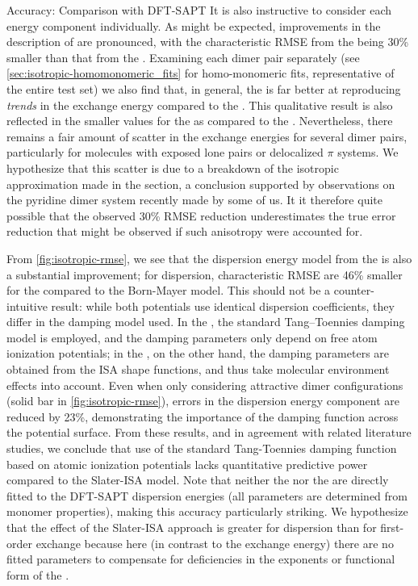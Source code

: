 \begin{subsection}{Accuracy: Comparison with DFT-SAPT}
It is also instructive to consider each energy component individually.  As
might be expected, improvements in the description of \erep are pronounced,
with the characteristic RMSE from the \isaffold being 30\% smaller than that from the \saptff.
Examining each dimer pair separately (see
\cref{sec:isotropic-homomonomeric_fits} for homo-monomeric
fits, representative of the entire test set) we also find that, in general, the \isaffold
is far better at reproducing \emph{trends} in the exchange energy compared to
the \saptff. This qualitative result is also reflected in the smaller \mse
values for the \isaffold as compared to the \saptff.
Nevertheless, there remains a fair amount of scatter in the exchange
energies for several dimer pairs, particularly for molecules with exposed lone
pairs or delocalized $\pi$ systems. We hypothesize that this scatter is due to
a breakdown of the isotropic approximation made in the 
section, a conclusion supported by observations on the pyridine dimer system
recently made by some of us.\cite{Misquitta2015b}
It it therefore quite possible that the observed 30\% RMSE reduction 
underestimates the true error reduction that might be observed
if such anisotropy were accounted for.

From  \cref{fig:isotropic-rmse}, we see that the dispersion energy model from the 
\isaffold is also a substantial improvement; for dispersion, characteristic RMSE
are 46\% smaller for the \isaffold compared to the Born-Mayer model.
This should not be a counter-intuitive result: while both potentials use identical
dispersion coefficients, they differ in the damping model used.
In the \saptff, the standard Tang--Toennies damping model is employed, and 
the damping parameters only depend on free atom ionization potentials; 
in the \isaffold, on the other hand, the damping parameters are obtained from the
ISA shape functions, and thus take 
molecular environment effects into account.
Even when only considering attractive dimer configurations (solid bar in
\cref{fig:isotropic-rmse}), errors in the dispersion energy component are reduced by 23\%,
demonstrating the importance of the damping function across the potential surface. 
From these results, and in agreement with related literature
studies,\cite{Sebetci2010} we conclude that use of
the standard Tang-Toennies damping function based on atomic ionization
potentials
\cite{Tang1984, Misquitta2008a, Price2010, Totton2010a, McDaniel2013, Hermida-Ramon2000, Nyeland1990} 
lacks quantitative predictive power compared to the Slater-ISA model.
Note that neither the \isaffold nor the \saptff are directly fitted to the DFT-SAPT
dispersion energies (all parameters are determined from monomer properties),
making this accuracy particularly striking.  We hypothesize that the effect of
the Slater-ISA approach is greater for dispersion than for first-order exchange
because here (in contrast to the exchange energy) there are no fitted
parameters to compensate for deficiencies in the exponents or functional form
of the \saptff.


\end{subsection}
